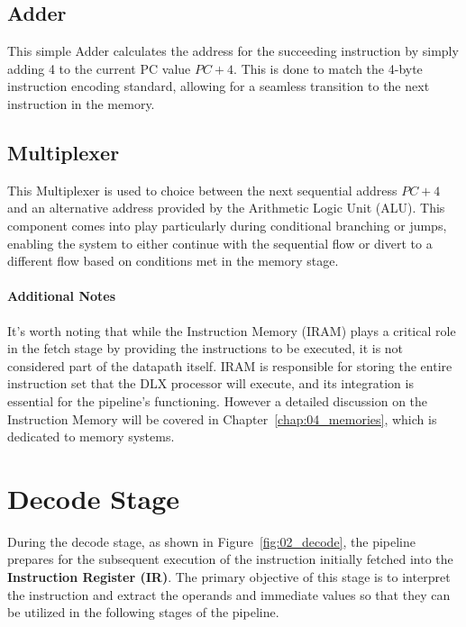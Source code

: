 \subsection{Adder}
This simple Adder calculates the address for the succeeding instruction by simply adding 4 to the current PC value \(PC + 4\). This is done to match the 4-byte instruction encoding standard, allowing for a seamless transition to the next instruction in the memory.

\subsection{Multiplexer}
This Multiplexer is used to choice between the next sequential address \(PC + 4\) and an alternative address provided by the Arithmetic Logic Unit (ALU). This component comes into play particularly during conditional branching or jumps, enabling the system to either continue with the sequential flow or divert to a different flow based on conditions met in the memory stage.

\paragraph{Additional Notes}
It's worth noting that while the Instruction Memory (IRAM) plays a critical role in the fetch stage by providing the instructions to be executed, it is not considered part of the datapath itself. IRAM is responsible for storing the entire instruction set that the DLX processor will execute, and its integration is essential for the pipeline's functioning. However a detailed discussion on the Instruction Memory will be covered in Chapter~\ref{chap:04_memories}, which is dedicated to memory systems.


\newpage
\section{Decode Stage}
During the decode stage, as shown in Figure~\ref{fig:02_decode}, the pipeline prepares for the subsequent execution of the instruction initially fetched into the \textbf{Instruction Register (IR)}. The primary objective of this stage is to interpret the instruction and extract the operands and immediate values so that they can be utilized in the following stages of the pipeline. \\


